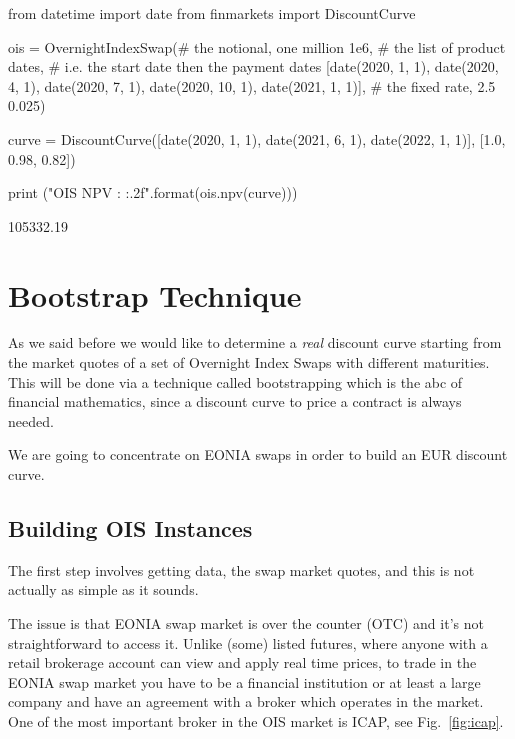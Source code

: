 \begin{ipython}
from datetime import date
from finmarkets import DiscountCurve

ois = OvernightIndexSwap(# the notional, one million
                         1e6,
                         # the list of product dates,
                         # i.e. the start date then the payment dates
                         [date(2020, 1, 1), date(2020, 4, 1),
                          date(2020, 7, 1), date(2020, 10, 1),
                          date(2021, 1, 1)],
                         # the fixed rate, 2.5%
                         0.025)

curve = DiscountCurve([date(2020, 1, 1), date(2021, 6, 1),
                       date(2022, 1, 1)],
                      [1.0, 0.98, 0.82])

print ("OIS NPV : {:.2f}".format(ois.npv(curve)))
\end{ipython}
\begin{ioutput}
105332.19
\end{ioutput}

\section{Bootstrap Technique}
\label{bootstrapping-technique}

As we said before we would like to determine a \emph{real} discount
curve starting from the market quotes of a set of Overnight Index Swaps with different maturities. This will be done via a technique called bootstrapping which is the abc of financial mathematics, since a discount curve to price a contract is always needed.

We are going to concentrate on EONIA swaps in order to build an EUR discount curve.

\subsection{Building OIS Instances}
\label{building-ois-instances}

The first step involves getting data, the swap market quotes, and this is not actually as simple as it sounds.

The issue is that EONIA swap market is over the counter (OTC) and it's not straightforward to access it. Unlike (some) listed futures, where anyone with a retail brokerage account can view and apply real time prices, to trade in the EONIA swap market you have to be a financial institution or at least a large company and have an agreement with a broker which operates in the market. One of the most important broker in the OIS market is ICAP, see Fig.~\ref{fig:icap}.

